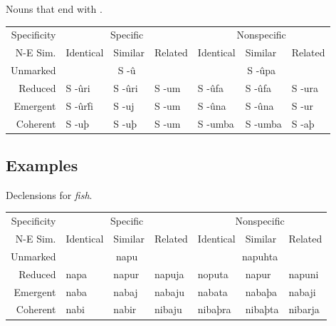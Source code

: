 \documentclass{book}
\begin{document}
\begin{tablenf}
  \caption{Nouns that end with . \label{table:declensionlast}}
  \centering
  \begin{tabular}{r|lll|lll}
    Specificity & \multicolumn{3}{c|}{Specific} & \multicolumn{3}{c}{Nonspecific} \\
    N-E \bs{} Sim. & Identical & Similar & Related & Identical & Similar & Related \\
    \hline
    Unmarked & \multicolumn{3}{c|}{S -û} & \multicolumn{3}{c}{S -ûpa} \\
    Reduced & S -ûri & S -ûri & S -um & S -ûfa & S -ûfa & S -ura \\
    Emergent & S -ûrḟi & S -uj & S -um & S -ûna & S -ûna & S -ur \\
    Coherent & S -uþ & S -uþ & S -um & S -umba & S -umba & S -aþ \\
  \end{tabular}
\end{tablenf}

\subsection{Examples}

\begin{tablenf}
  \caption{Declensions for  \emph{fish}. \label{table:declensionex1}}
  \centering
  \begin{tabular}{r|lll|lll}
    Specificity & \multicolumn{3}{c|}{Specific} & \multicolumn{3}{c}{Nonspecific} \\
    N-E \bs{} Sim. & Identical & Similar & Related & Identical & Similar & Related \\
    \hline
    Unmarked & \multicolumn{3}{c|}{napu} & \multicolumn{3}{c}{napuhta} \\
    Reduced & napa & napur & napuja & noputa & napur & napuni \\
    Emergent & naba & nabaj & nabaju & nabata & nabaþa & nabaji \\
    Coherent & nabi & nabir & nibaju & nibaþra & nibaþta & nibarja \\
  \end{tabular}
\end{tablenf}
\end{document}
